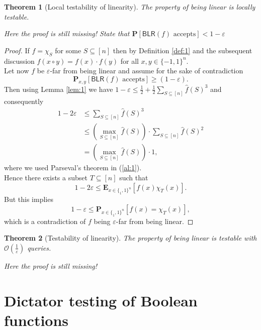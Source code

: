 \documentclass[a4paper]{article}
\newcommand{\prob}{\mathbf{P}}
\newcommand{\expe}{\mathbf{E}}
\newcommand{\nset}{[n]}
\newcommand{\eps}{\varepsilon}
\theoremstyle{plain}
\newtheorem{theorem}{Theorem}
\theoremstyle{definition}
\begin{document}
\begin{theorem}[Local testability of linearity]
  The property of being linear is locally testable. 
\end{theorem}

\emph{Here the proof is still missing! State that
  \(\prob[\textsf{BLR}(f) \text{ accepts}] < 1 - \eps\)}

\begin{proof}
  If \(f = \chi_S\) for some \(S\subseteq \nset\) then by Definition
  \ref{def:1} and the subsequent discussion \(f(x\circ y) = f(x) \cdot
  f(y)\) for all \(x,y \in \{-1,1\}^n\). \\
  Let now \(f\) be \(\eps\)-far from being linear and assume for the
  sake of contradiction 
  \[\prob_{x,y}\left[\textsf{BLR}(f) \text{ accepts}\right] \geq
  (1-\eps). \]
  Then using Lemma \ref{lem:1} we have \(1-\eps \leq \frac{1}{2} +
  \frac{1}{2} \sum_{S\subseteq \nset}\hat{f}(S)^3\) and consequently
  \begin{align}
    1 - 2\eps &\leq \sum_{S\subseteq \nset}\hat{f}(S)^3 \\
    &\leq \left(\max_{S\subseteq \nset} \hat{f}(S)\right)\cdot \sum_{S\subseteq \nset}\hat{f}(S)^2 \\
    &= \left(\max_{S\subseteq \nset} \hat{f}(S)\right) \cdot 1,  \label{al:1}
  \end{align}
  where we used Parseval's theorem in (\ref{al:1}). \\
  Hence there exists a subset \(T \subseteq \nset\) such that 
  \[1 - 2\eps \leq \expe_{x\in\{_1,1\}^n}\left[f(x)\chi_T(x)\right].\]
  But this implies 
  \[1 - \eps \leq \prob_{x\in\{_1,1\}^n}[f(x) = \chi_T(x)], \]
  which is a contradiction of \(f\) being \(\eps\)-far from being
  linear. 
\end{proof}

\begin{theorem}[Testability of linearity]
  The property of being linear is testable with
  \(\mathcal{O}\left(\frac{1}{\eps}\right)\) queries. 
\end{theorem}

\emph{Here the proof is still missing!}

\section{Dictator testing of Boolean functions}
\label{sec:dict-test-bool}
\end{document}

